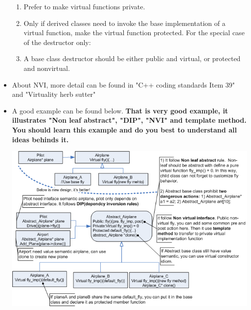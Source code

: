 \documentclass[a4paper,11pt,twoside]{book}
\begin{document}
\begin{itemize}
\begin{enumerate}
	\item Prefer to make virtual functions private.
	
	\item Only if derived classes need to invoke the base implementation of a virtual function, make the virtual function protected. For the special case of the destructor only:
	
	\item A base class destructor should be either public and virtual, or protected and nonvirtual.
\end{enumerate}

    \item About NVI, more detail can be found in "C++ coding standards Item 39" and "Virtuality herb sutter"

    \item A good example can be found below. \textbf{That is very good example, it illustrates "Non leaf abstract", "DIP", "NVI" and template method. You should learn this example and do you best to understand all ideas behinds it. }

	\centering
	\includegraphics[width=0.93\linewidth]{pics/NVI.png}


\end{itemize}
\end{document}
